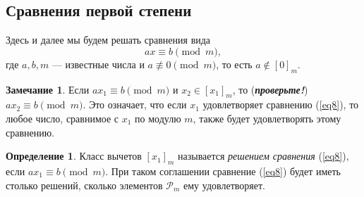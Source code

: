 \documentclass[14pt, a4paper]{extarticle}
\theoremstyle{definition}
\newtheorem*{definition}{Определение}
\newtheorem*{remark}{Замечание}
\begin{document}
\subsection{Сравнения первой степени}
\label{srx}

	Здесь и далее мы будем решать сравнения вида
	\begin{equation}
	\label{eq8}
		ax\equiv b\pmod{m},
	\end{equation}
	где $a,b,m$ --- известные числа и $a\not\equiv0\pmod{m}$, то есть $a\notin[0]_m$.
	
	\begin{remark}
		Если $ax_1\equiv b\pmod{m}$ и $x_2\in[x_1]_m$, то (\textbf{\textit{проверьте!}}) $ax_2\equiv b\pmod{m}$. Это означает, что если $x_1$ удовлетворяет сравнению (\ref{eq8}), то любое число, сравнимое с $x_1$ по модулю $m$, также будет удовлетворять этому сравнению.
	\end{remark}
	
	\begin{definition}
		Класс вычетов $[x_1]_m$ называется \emph{решением сравнения} (\ref{eq8}), если $ax_1\equiv b\pmod{m}$. При таком соглашении сравнение (\ref{eq8}) будет иметь столько решений, сколько элементов $\mathcal{P}_m$ ему удовлетворяет. 
	\end{definition}
\end{document}
